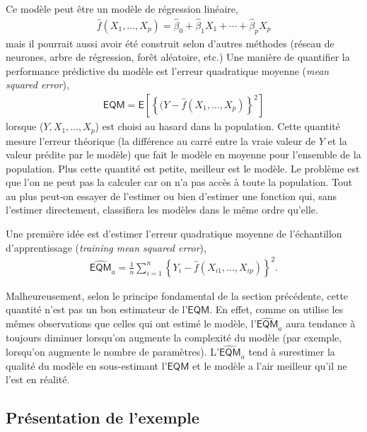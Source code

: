 \documentclass[
  11pt,
  letterpaper,
]{book}
\theoremstyle{definition}
\theoremstyle{remark}
\begin{document}
Ce modèle peut être un modèle de régression linéaire, \begin{align*}
\widehat{f}(X_1, \ldots, X_p) = \widehat{\beta}_0 + \widehat{\beta}_1X_1 + \cdots + \widehat{\beta}_pX_p
\end{align*} mais il pourrait aussi avoir été construit selon d'autres
méthodes (réseau de neurones, arbre de régression, forêt aléatoire,
etc.) Une manière de quantifier la performance prédictive du modèle est
l'erreur quadratique moyenne (\emph{mean squared error}), \begin{align*}
\mathsf{EQM}=\mathsf{E}\left[\left\{(Y-\widehat{f}(X_1, \ldots, X_p)\right\}^2\right]
\end{align*} lorsque (\(Y, X_1, \ldots, X_p\)) est choisi au hasard dans
la population. Cette quantité mesure l'erreur théorique (la différence
au carré entre la vraie valeur de \(Y\) et la valeur prédite par le
modèle) que fait le modèle en moyenne pour l'ensemble de la population.
Plus cette quantité est petite, meilleur est le modèle. Le problème est
que l'on ne peut pas la calculer car on n'a pas accès à toute la
population. Tout au plus peut-on essayer de l'estimer ou bien d'estimer
une fonction qui, sans l'estimer directement, classifiera les modèles
dans le même ordre qu'elle.

Une première idée est d'estimer l'erreur quadratique moyenne de
l'échantillon d'apprentissage (\emph{training mean squared error}),
\begin{align*}
\widehat{\mathsf{EQM}}_a= \frac{1}{n}\sum_{i=1}^n \left\{Y_i-\widehat{f}(X_{i1}, \ldots, X_{ip})\right\}^2.
\end{align*}

Malheureusement, selon le principe fondamental de la section précédente,
cette quantité n'est pas un bon estimateur de l'\(\mathsf{EQM}\). En
effet, comme on utilise les mêmes observations que celles qui ont estimé
le modèle, l'\(\widehat{\mathsf{EQM}}_a\) aura tendance à toujours
diminuer lorsqu'on augmente la complexité du modèle (par exemple,
lorsqu'on augmente le nombre de paramètres).
L'\(\widehat{\mathsf{EQM}}_a\) tend à surestimer la qualité du modèle en
sous-estimant l'\(\mathsf{EQM}\) et le modèle a l'air meilleur qu'il ne
l'est en réalité.

\hypertarget{pruxe9sentation-de-lexemple}{%
\subsection{Présentation de
l'exemple}\label{pruxe9sentation-de-lexemple}}
\end{document}
